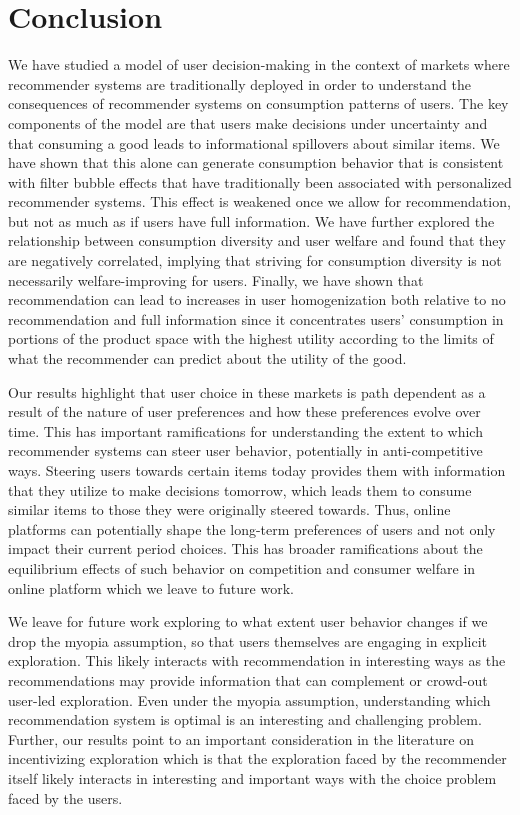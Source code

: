 \documentclass[format=acmsmall, review=false]{acmart}
\begin{document}
\section{Conclusion}
We have studied a model of user decision-making in the context of markets where recommender systems are traditionally deployed in order to understand the consequences of recommender systems on consumption patterns of users. The key components of the model are that users make decisions under uncertainty and that consuming a good leads to informational spillovers about similar items. We have shown that this alone can generate consumption behavior that is consistent with filter bubble effects that have traditionally been associated with personalized recommender systems. This effect is weakened once we allow for recommendation, but not as much as if users have full information. We have further explored the relationship between consumption diversity and user welfare and found that they are negatively correlated, implying that striving for consumption diversity is not necessarily welfare-improving for users. Finally, we have shown that recommendation can lead to increases in user homogenization both relative to no recommendation and full information since it concentrates users' consumption in portions of the product space with the highest utility according to the limits of what the recommender can predict about the utility of the good.
\par 
Our results highlight that user choice in these markets is path dependent as a result of the nature of user preferences and how these preferences evolve over time. This has important ramifications for understanding the extent to which recommender systems can steer user behavior, potentially in anti-competitive ways. Steering users towards certain items today provides them with information that they utilize to make decisions tomorrow, which leads them to consume similar items to those they were originally steered towards. Thus, online platforms can potentially shape the long-term preferences of users and not only impact their current period choices. This has broader ramifications about the equilibrium effects of such behavior on competition and consumer welfare in online platform which we leave to future work.
\par
We leave for future work exploring to what extent user behavior changes if we drop the myopia assumption, so that users themselves are engaging in explicit exploration. This likely interacts with recommendation in interesting ways as the recommendations may provide information that can complement or crowd-out user-led exploration. Even under the myopia assumption, understanding which recommendation system is optimal is an interesting and challenging problem. Further, our results point to an important consideration in the literature on incentivizing exploration which is that the exploration faced by the recommender itself likely interacts in interesting and important ways with the choice problem faced by the users.
\end{document}
